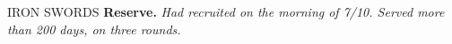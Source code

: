 
  \begin{rubric}{IRON SWORDS}
\entry*[2023 -- 2024] \textbf{Reserve.} \emph{Had recruited on the morning of 7/10. Served more than 200 days, on three rounds.}  
\end{rubric}
